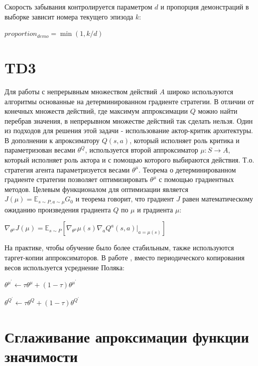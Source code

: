 \documentclass{mipt-thesis-bs}
\begin{document}
Скорость забывания контролируется параметром $d$ и пропорция демонстраций в выборке зависит номера текущего эпизода $k$:

\begin{center}
    $proportion_{demo} = \min(1, k/d)$
\end{center}

\section{TD3}

Для работы с непрерывным множеством действий $A$ широко используются алгоритмы основанные на детерминированном градиенте стратегии. В отличии от конечных множеств действий, где максимум аппроксимации $Q$ можно найти перебрав значения, в непрерывном множестве действий так сделать нельзя. Один из подходов для решения этой задачи - использование актор-критик архитектуры. В дополнении к апроксиматору $Q(s,a)$, который исполняет роль критика и параметризован весами $\theta^Q$, используется второй аппроксиматор $\mu:S\rightarrow A$, который исполняет роль актора и с помощью которого выбираются действия. Т.о. стратегия агента параметризуется весами $\theta^\mu$. Теорема о детерминированном градиенте стратегии позволяет оптимизировать $\theta^\mu$ с помощью градиентных методов. Целевым функционалом для оптимизации является $J(\mu)=\mathbb{E}_{s\sim P, a\sim\mu}G_0$ и теорема говорит, что градиент $J$ равен математическому ожиданию произведения градиента $Q$ по $\mu$ и градиента $\mu$:

\begin{center}
$\nabla_{\theta^\mu} J(\mu) =\mathbb{E}_{s \sim P}[\nabla_{\theta^\mu} \mu(s) \nabla_{a} Q^{a}(s, a)|_{a=\mu(s)}]$
\end{center}

На практике, чтобы обучение было более стабильным, также используются таргет-копии аппроксиматоров. В работе \cite{ddpg}, вместо периодического копирования весов используется усреднение Поляка:

\begin{center}
    $\theta^{\mu^{\prime}} \leftarrow \tau \theta^{\mu}+(1-\tau) \theta^{\mu^{\prime}}$
    
     $\theta^{Q^{\prime}} \leftarrow \tau \theta^{Q}+(1-\tau) \theta^{Q^{\prime}}$
\end{center}

\section{Сглаживание апроксимации функции значимости}
\end{document}
